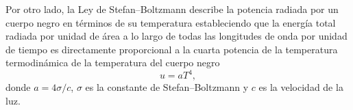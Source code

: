 \documentclass{article}
\begin{document}
Por otro lado, la Ley de Stefan–Boltzmann describe la potencia radiada por un
cuerpo negro en términos de su temperatura estableciendo que la energía total
radiada por unidad de área a lo largo de todas las longitudes de onda por
unidad de tiempo es directamente proporcional a la cuarta potencia de la
temperatura termodinámica de la temperatura del cuerpo negro
\begin{equation}\label{eq:ley-stefan-boltzmann}
u = aT^{4},
\end{equation}
donde $a =4 \sigma/c$, $\sigma$ es la constante de Stefan–Boltzmann y $c$ es la
velocidad de la luz. 








\end{document}
